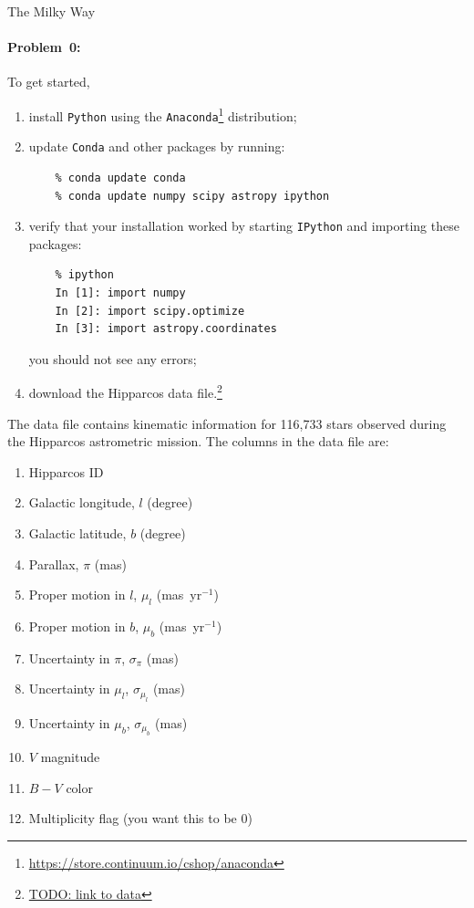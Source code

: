 \documentclass[12pt,twoside]{article}
\newcommand{\projectname}[1]{\begin{center} {\huge {#1}} \end{center}}
\newcommand{\problemname}{Problem}
\newcounter{problem}
\newenvironment{problem0}{\paragraph{\problemname~0:}}{}
\begin{document}
\projectname{The Milky Way}

\begin{problem0}
To get started, 
	\begin{enumerate}
		\item install \texttt{Python} using the \texttt{Anaconda}\footnote{\url{https://store.continuum.io/cshop/anaconda}} distribution;
		\item update \texttt{Conda} and other packages by running:
			\begin{verbatim}
    % conda update conda
    % conda update numpy scipy astropy ipython
			\end{verbatim}
		\item verify that your installation worked by starting \texttt{IPython} and importing these packages:
			\begin{verbatim}
    % ipython
    In [1]: import numpy
    In [2]: import scipy.optimize
    In [3]: import astropy.coordinates
			\end{verbatim}
			you should not see any errors;
		\item download the Hipparcos data file.\footnote{\url{TODO: link to data}}
		
	\end{enumerate}
	
The data file contains kinematic information for 116,733 stars observed during the Hipparcos astrometric mission. The columns in the data file are:
\begin{multicols}{2}
	\begin{enumerate}[align=left,leftmargin=!,label={\bf Col. \arabic*:}]
		\item Hipparcos ID
		\item Galactic longitude, $l$ (degree)
		\item Galactic latitude, $b$ (degree)
		\item Parallax, $\pi$ (mas)
		\item Proper motion in $l$, $\mu_l$ (mas~yr$^{-1}$)
		\item Proper motion in $b$, $\mu_b$ (mas~yr$^{-1}$)
		\item Uncertainty in $\pi$, $\sigma_\pi$ (mas)
		\item Uncertainty in $\mu_l$, $\sigma_{\mu_l}$ (mas)
		\item Uncertainty in $\mu_b$, $\sigma_{\mu_b}$ (mas)
		\item $V$ magnitude
		\item $B-V$ color
		\item Multiplicity flag (you want this to be 0)
	\end{enumerate}
\end{multicols}
\end{problem0}
\end{document}
